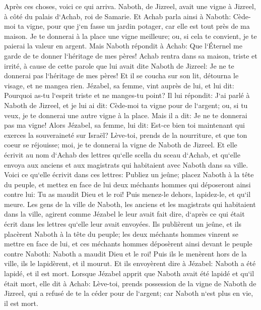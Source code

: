 \verse Après ces choses, voici ce qui arriva. Naboth, de Jizreel, avait une vigne à Jizreel, à côté du palais d`Achab, roi de Samarie. 
\verse Et Achab parla ainsi à Naboth: Cède-moi ta vigne, pour que j`en fasse un jardin potager, car elle est tout près de ma maison. Je te donnerai à la place une vigne meilleure; ou, si cela te convient, je te paierai la valeur en argent. 
\verse Mais Naboth répondit à Achab: Que l`Éternel me garde de te donner l`héritage de mes pères! 
\verse Achab rentra dans sa maison, triste et irrité, à cause de cette parole que lui avait dite Naboth de Jizreel: Je ne te donnerai pas l`héritage de mes pères! Et il se coucha sur son lit, détourna le visage, et ne mangea rien. 
\verse Jézabel, sa femme, vint auprès de lui, et lui dit: Pourquoi as-tu l`esprit triste et ne manges-tu point? 
\verse Il lui répondit: J`ai parlé à Naboth de Jizreel, et je lui ai dit: Cède-moi ta vigne pour de l`argent; ou, si tu veux, je te donnerai une autre vigne à la place. Mais il a dit: Je ne te donnerai pas ma vigne! 
\verse Alors Jézabel, sa femme, lui dit: Est-ce bien toi maintenant qui exerces la souveraineté sur Israël? Lève-toi, prends de la nourriture, et que ton coeur se réjouisse; moi, je te donnerai la vigne de Naboth de Jizreel. 
\verse Et elle écrivit au nom d`Achab des lettres qu`elle scella du sceau d`Achab, et qu`elle envoya aux anciens et aux magistrats qui habitaient avec Naboth dans sa ville. 
\verse Voici ce qu`elle écrivit dans ces lettres: Publiez un jeûne; placez Naboth à la tête du peuple, 
\verse et mettez en face de lui deux méchants hommes qui déposeront ainsi contre lui: Tu as maudit Dieu et le roi! Puis menez-le dehors, lapidez-le, et qu`il meure. 
\verse Les gens de la ville de Naboth, les anciens et les magistrats qui habitaient dans la ville, agirent comme Jézabel le leur avait fait dire, d`après ce qui était écrit dans les lettres qu`elle leur avait envoyées. 
\verse Ils publièrent un jeûne, et ils placèrent Naboth à la tête du peuple; 
\verse les deux méchants hommes vinrent se mettre en face de lui, et ces méchants hommes déposèrent ainsi devant le peuple contre Naboth: Naboth a maudit Dieu et le roi! Puis ils le menèrent hors de la ville, ils le lapidèrent, et il mourut. 
\verse Et ils envoyèrent dire à Jézabel: Naboth a été lapidé, et il est mort. 
\verse Lorsque Jézabel apprit que Naboth avait été lapidé et qu`il était mort, elle dit à Achab: Lève-toi, prends possession de la vigne de Naboth de Jizreel, qui a refusé de te la céder pour de l`argent; car Naboth n`est plus en vie, il est mort. 
